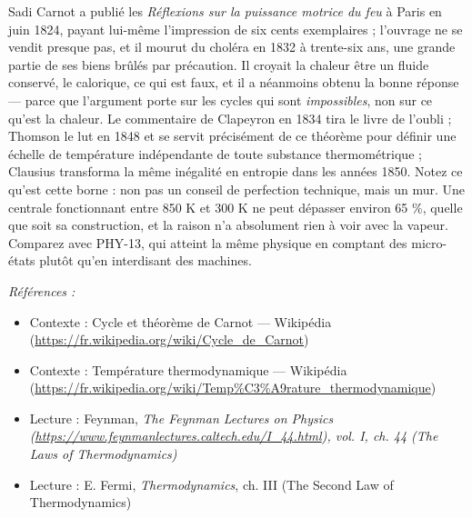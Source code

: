 \documentclass[11pt]{article}
\newenvironment{refs}{\par\small\noindent\emph{Références :}\begin{itemize}\setlength\itemsep{0pt}}{\end{itemize}\normalsize}
\begin{document}
\noindent Sadi Carnot a publié les \textit{Réflexions sur la puissance motrice du feu} à
Paris en juin 1824, payant lui-même l'impression de six cents exemplaires ; l'ouvrage ne se vendit
presque pas, et il mourut du choléra en 1832 à trente-six ans, une grande partie de ses biens
brûlés par précaution. Il croyait la chaleur être un fluide conservé, le calorique, ce qui est
faux, et il a néanmoins obtenu la bonne réponse --- parce que l'argument porte sur les cycles qui
sont \textit{impossibles}, non sur ce qu'est la chaleur. Le commentaire de Clapeyron en 1834 tira le
livre de l'oubli ; Thomson le lut en 1848 et se servit précisément de ce théorème pour définir une
échelle de température indépendante de toute substance thermométrique ; Clausius transforma la
même inégalité en entropie dans les années 1850. Notez ce qu'est cette borne : non pas un conseil
de perfection technique, mais un mur. Une centrale fonctionnant entre 850 K et 300 K ne peut
dépasser environ 65 \%, quelle que soit sa construction, et la raison n'a absolument rien à voir
avec la vapeur. Comparez avec PHY-13, qui atteint la même physique en comptant des micro-états
plutôt qu'en interdisant des machines.

\begin{refs}
\item Contexte : Cycle et théorème de Carnot --- Wikipédia (\url{https://fr.wikipedia.org/wiki/Cycle_de_Carnot})
\item Contexte : Température thermodynamique --- Wikipédia (\url{https://fr.wikipedia.org/wiki/Temp%C3%A9rature_thermodynamique})
\item Lecture : Feynman, \textit{The Feynman Lectures on Physics (\url{https://www.feynmanlectures.caltech.edu/I_44.html}), vol. I, ch. 44 (The Laws of Thermodynamics)}
\item Lecture : E. Fermi, \textit{Thermodynamics}, ch. III (The Second Law of Thermodynamics)
\end{refs}

\bigskip
\end{document}
